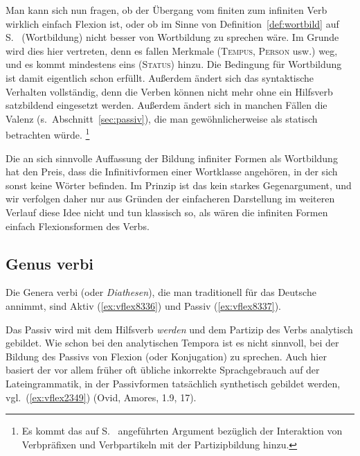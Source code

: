 \label{abs:infinwortbild}Man kann sich nun fragen, ob der Übergang vom finiten zum infiniten Verb wirklich einfach Flexion ist, oder ob im Sinne von Definition~\ref{def:wortbild} auf S.~\pageref{def:wortbild} (Wortbildung) nicht besser von Wortbildung zu sprechen wäre.
Im Grunde wird dies hier vertreten, denn es fallen Merkmale (\textsc{Tempus}, \textsc{Person} usw.) weg, und es kommt mindestens eins (\textsc{Status}) hinzu.
Die Bedingung für Wortbildung ist damit eigentlich schon erfüllt.
Außerdem ändert sich das syntaktische Verhalten vollständig, denn die Verben können nicht mehr ohne ein Hilfsverb satzbildend eingesetzt werden.
Außerdem ändert sich in manchen Fällen die Valenz (s.\ Abschnitt~\ref{sec:passiv}), die man gewöhnlicherweise als statisch betrachten würde.%
\footnote{Es kommt das auf S.\ \pageref{abs:praefixundflex} angeführten Argument bezüglich der Interaktion von Verbpräfixen und Verbpartikeln mit der Partizipbildung hinzu.}

Die an sich sinnvolle Auffassung der Bildung infiniter Formen als Wortbildung hat den Preis, dass die Infinitivformen einer Wortklasse angehören, in der sich sonst keine Wörter befinden.
Im Prinzip ist das kein starkes Gegenargument, und wir verfolgen daher nur aus Gründen der einfacheren Darstellung im weiteren Verlauf diese Idee nicht und tun klassisch so, als wären die infiniten Formen einfach Flexionsformen des Verbs.

\subsection{Genus verbi}

\label{sec:genusverb}


Die Genera verbi (oder \textit{Diathesen}), die man traditionell für das Deutsche annimmt, sind Aktiv (\ref{ex:vflex8336}) und Passiv (\ref{ex:vflex8337}).

\begin{exe}
\end{exe}

Das Passiv wird mit dem Hilfsverb \textit{werden} und dem Partizip des Verbs analytisch gebildet.
Wie schon bei den analytischen Tempora ist es nicht sinnvoll, bei der Bildung des Passivs von Flexion (oder Konjugation) zu sprechen.
Auch hier basiert der vor allem früher oft übliche inkorrekte Sprachgebrauch auf der Lateingrammatik, in der Passivformen tatsächlich synthetisch gebildet werden, vgl.\ (\ref{ex:vflex2349}) (Ovid, Amores, 1.9, 17).

